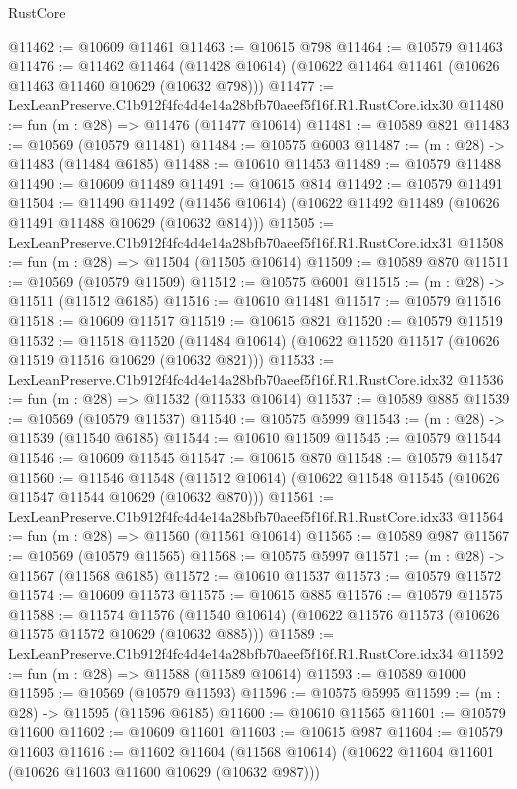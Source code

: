 \begin{lexlean}{RustCore}
\begin{coremodule}
@11462 := @10609 @11461
@11463 := @10615 @798
@11464 := @10579 @11463
@11476 := @11462
    @11464
    (@11428 @10614)
    (@10622 @11464 @11461 (@10626 @11463 @11460 @10629 (@10632 @798)))
@11477 := LexLeanPreserve.C1b912f4fc4d4e14a28bfb70aeef5f16f.R1.RustCore.idx30
@11480 := fun (m : @28) => @11476 (@11477 @10614)
@11481 := @10589 @821
@11483 := @10569 (@10579 @11481)
@11484 := @10575 @6003
@11487 := (m : @28) -> @11483 (@11484 @6185)
@11488 := @10610 @11453
@11489 := @10579 @11488
@11490 := @10609 @11489
@11491 := @10615 @814
@11492 := @10579 @11491
@11504 := @11490
    @11492
    (@11456 @10614)
    (@10622 @11492 @11489 (@10626 @11491 @11488 @10629 (@10632 @814)))
@11505 := LexLeanPreserve.C1b912f4fc4d4e14a28bfb70aeef5f16f.R1.RustCore.idx31
@11508 := fun (m : @28) => @11504 (@11505 @10614)
@11509 := @10589 @870
@11511 := @10569 (@10579 @11509)
@11512 := @10575 @6001
@11515 := (m : @28) -> @11511 (@11512 @6185)
@11516 := @10610 @11481
@11517 := @10579 @11516
@11518 := @10609 @11517
@11519 := @10615 @821
@11520 := @10579 @11519
@11532 := @11518
    @11520
    (@11484 @10614)
    (@10622 @11520 @11517 (@10626 @11519 @11516 @10629 (@10632 @821)))
@11533 := LexLeanPreserve.C1b912f4fc4d4e14a28bfb70aeef5f16f.R1.RustCore.idx32
@11536 := fun (m : @28) => @11532 (@11533 @10614)
@11537 := @10589 @885
@11539 := @10569 (@10579 @11537)
@11540 := @10575 @5999
@11543 := (m : @28) -> @11539 (@11540 @6185)
@11544 := @10610 @11509
@11545 := @10579 @11544
@11546 := @10609 @11545
@11547 := @10615 @870
@11548 := @10579 @11547
@11560 := @11546
    @11548
    (@11512 @10614)
    (@10622 @11548 @11545 (@10626 @11547 @11544 @10629 (@10632 @870)))
@11561 := LexLeanPreserve.C1b912f4fc4d4e14a28bfb70aeef5f16f.R1.RustCore.idx33
@11564 := fun (m : @28) => @11560 (@11561 @10614)
@11565 := @10589 @987
@11567 := @10569 (@10579 @11565)
@11568 := @10575 @5997
@11571 := (m : @28) -> @11567 (@11568 @6185)
@11572 := @10610 @11537
@11573 := @10579 @11572
@11574 := @10609 @11573
@11575 := @10615 @885
@11576 := @10579 @11575
@11588 := @11574
    @11576
    (@11540 @10614)
    (@10622 @11576 @11573 (@10626 @11575 @11572 @10629 (@10632 @885)))
@11589 := LexLeanPreserve.C1b912f4fc4d4e14a28bfb70aeef5f16f.R1.RustCore.idx34
@11592 := fun (m : @28) => @11588 (@11589 @10614)
@11593 := @10589 @1000
@11595 := @10569 (@10579 @11593)
@11596 := @10575 @5995
@11599 := (m : @28) -> @11595 (@11596 @6185)
@11600 := @10610 @11565
@11601 := @10579 @11600
@11602 := @10609 @11601
@11603 := @10615 @987
@11604 := @10579 @11603
@11616 := @11602
    @11604
    (@11568 @10614)
    (@10622 @11604 @11601 (@10626 @11603 @11600 @10629 (@10632 @987)))

\end{coremodule}
\end{lexlean}
